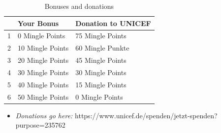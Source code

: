 \documentclass[12pt,oneside]{article}
\begin{document}
\begin{longtable}[]{@{}lll@{}}
\caption{Bonuses and donations}
\label{table:mingle}
\endfirsthead
\endhead
\toprule
& Your Bonus & Donation to UNICEF\tabularnewline
\midrule
\endhead
1 & 0 Mingle Points & 75 Mingle Points\tabularnewline
2 & 10 Mingle Points & 60 Mingle Punkte\tabularnewline
3 & 20 Mingle Points & 45 Mingle Points\tabularnewline
4 & 30 Mingle Points & 30 Mingle Points\tabularnewline
5 & 40 Mingle Points & 15 Mingle Points\tabularnewline
6 & 50 Mingle Points & 0 Mingle Points\tabularnewline
\bottomrule
\end{longtable}


\begin{itemize}
\item
  \emph{Donations go here:}
  https://www.unicef.de/spenden/jetzt-spenden?purpose=235762
\end{itemize}






\end{document}
